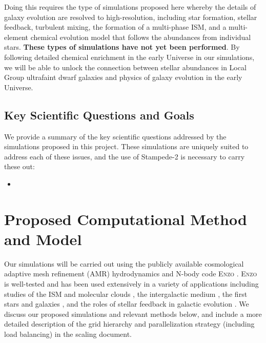\documentclass[12pt]{article} %
\begin{document}
Doing this requires the type of simulations proposed here whereby the details of galaxy evolution are resolved to high-resolution, including star formation, stellar feedback, turbulent mixing, the formation of a multi-phase ISM, and a multi-element chemical evolution model that follows the abundances from individual stars. \textbf{These types of simulations have not yet been performed}. By following detailed chemical enrichment in the early Universe in our simulations, we will be able to unlock the connection between stellar abundances in Local Group ultrafaint dwarf galaxies and physics of galaxy evolution in the early Universe.


\subsection{Key Scientific Questions and Goals}

We provide a summary of the key scientific questions addressed by the simulations proposed in this project. These simulations are uniquely suited to address each of these issues, and the use of Stampede-2 is necessary to carry these out:

\begin{itemize}
    \item 
\end{itemize}


\section{Proposed Computational Method and Model}

Our simulations will be carried out using the publicly available cosmological adaptive mesh refinement (AMR) hydrodynamics and N-body code \textsc{Enzo} \citep{Enzo2014,Enzo2019}. \textsc{Enzo} is well-tested and has been used extensively in a variety of applications including studies of the ISM and molecular clouds \citep[e.g.][]{Slyz2005,TaskerBryan2008,Jin2017}, the intergalactic medium \citep[e.g.][]{BryanMachacek2000,FangBryan2001,Tonnesen2017}, the first stars and galaxies \citep[e.g.][]{Wise2012a,Oshea2015,Regan2019}, and the roles of stellar feedback in galactic evolution \citep[e.g][]{SalemBryan2014,Goldbaum2016,Forbes2016,Li2019}. We discuss our proposed simulations and relevant methods below, and include a more detailed description of the grid hierarchy and parallelization strategy (including load balancing) in the scaling document. 
\end{document}
